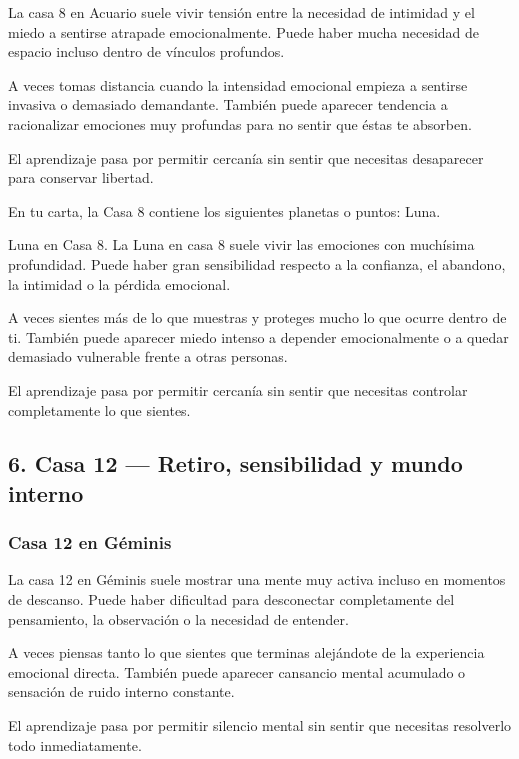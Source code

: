 \documentclass[11pt,a4paper]{article}
\begin{document}
La casa 8 en Acuario suele vivir tensión entre la necesidad de intimidad y el miedo a sentirse atrapade emocionalmente. Puede haber mucha necesidad de espacio incluso dentro de vínculos profundos.

A veces tomas distancia cuando la intensidad emocional empieza a sentirse invasiva o demasiado demandante. También puede aparecer tendencia a racionalizar emociones muy profundas para no sentir que éstas te absorben.

El aprendizaje pasa por permitir cercanía sin sentir que necesitas desaparecer para conservar libertad.

En tu carta, la Casa 8 contiene los siguientes planetas o puntos: Luna.

Luna en Casa 8.
La Luna en casa 8 suele vivir las emociones con muchísima profundidad. Puede haber gran sensibilidad respecto a la confianza, el abandono, la intimidad o la pérdida emocional.

A veces sientes más de lo que muestras y proteges mucho lo que ocurre dentro de ti. También puede aparecer miedo intenso a depender emocionalmente o a quedar demasiado vulnerable frente a otras personas.

El aprendizaje pasa por permitir cercanía sin sentir que necesitas controlar completamente lo que sientes.

\vspace{0.4cm}

\subsection{6. Casa 12 — Retiro, sensibilidad y mundo interno}

\subsubsection*{Casa 12 en Géminis}

La casa 12 en Géminis suele mostrar una mente muy activa incluso en momentos de descanso. Puede haber dificultad para desconectar completamente del pensamiento, la observación o la necesidad de entender.

A veces piensas tanto lo que sientes que terminas alejándote de la experiencia emocional directa. También puede aparecer cansancio mental acumulado o sensación de ruido interno constante.

El aprendizaje pasa por permitir silencio mental sin sentir que necesitas resolverlo todo inmediatamente.
\end{document}
